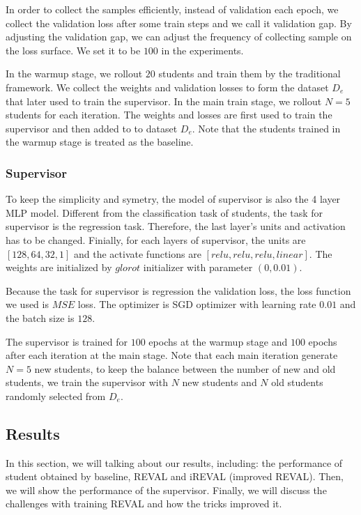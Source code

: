 \documentclass[english]{sobraep}
\begin{document}
In order to collect the samples efficiently, instead of validation each epoch, we collect the validation loss after some train steps and we call it validation gap. By adjusting the validation gap, we can adjust the frequency of collecting sample on the loss surface.  We set it to be $100$ in the experiments.

In the warmup stage, we rollout $20$ students and train them by the traditional framework. We collect the weights and validation losses to form the dataset $D_e$ that later used to train the supervisor. In the main train stage, we rollout $N=5$ students for each iteration. The weights and losses are first used to train the supervisor and then added to to dataset $D_e$. Note that the students trained in the warmup stage is treated as the baseline. 

\subsubsection{Supervisor} To keep the simplicity and symetry, the model of supervisor is also the 4 layer MLP model. Different from the classification task of students, the task for supervisor is the regression task. Therefore, the last layer's units and activation has to be changed. Finially, for each layers of supervisor, the units are $[128, 64, 32, 1]$ and the activate functions are $[relu, relu, relu, linear]$. The weights are initialized by $glorot$ initializer with parameter $(0, 0.01)$.

Because the task for supervisor is regression the validation loss, the loss function we used is $MSE$ loss. The optimizer is SGD optimizer with learning rate $0.01$ and the batch size is $128$.

The supervisor is trained for $100$ epochs at the warmup stage and $100$ epochs after each iteration at the main stage. Note that each main iteration generate $N=5$ new students, to keep the balance between the number of new and old students, we train the supervisor with $N$ new students and $N$ old students randomly selected from $D_e$.


\subsection{Results}
In this section, we will talking about our results, including: the performance of student obtained by baseline, REVAL and iREVAL (improved REVAL). Then, we will show the performance of the supervisor. Finally, we will discuss the challenges with training REVAL and how the tricks improved it.
\end{document}
